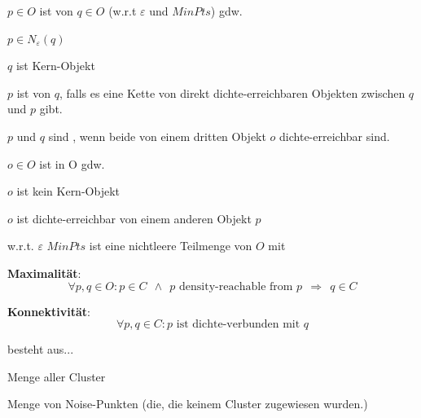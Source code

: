 \documentclass[10pt]{article} %
\begin{document}
\begin{definition} 
     $p \in O$ ist  von $q \in O$ (w.r.t $\varepsilon$ und $\mathit{MinPts}$) gdw.
\begin{cptitemize} 
     \item $p \in N_\varepsilon(q)$ 
     \item $q$ ist Kern-Objekt
\end{cptitemize} 
\end{definition} 

\begin{definition} 
     $p$ ist  von $q$, falls es eine Kette von direkt dichte-erreichbaren Objekten zwischen $q$ und $p$ gibt. 
\end{definition} 

\begin{definition} 
     $p$ und $q$ sind , wenn beide von einem dritten Objekt $o$ dichte-erreichbar sind. 
\end{definition} 

\begin{definition} 
     $o \in O$ ist  in O gdw.
\begin{cptitemize} 
     \item $o$ ist kein Kern-Objekt
     \item $o$ ist dichte-erreichbar von einem anderen Objekt $p$ 
\end{cptitemize}  
\end{definition} 

\begin{definition}[Cluster] w.r.t. $\varepsilon$ $\mathit{MinPts}$ ist eine nichtleere Teilmenge von $O$ mit
\begin{cptitemize} 
     \item \textbf{Maximalität}: $$
      \forall p,q \in O: p \in C ~~ \land ~~ p \text{ density-reachable from } p ~~ \Rightarrow ~~ q \in C
     $$
     \item \textbf{Konnektivität}: $$
      \forall p,q \in C: p \text{ ist dichte-verbunden mit } q
     $$
\end{cptitemize} 
\end{definition} 

\begin{definition}[Clustering] besteht aus...
     \begin{cptitemize} 
           \item  Menge aller Cluster
           \item Menge von Noise-Punkten (die, die keinem Cluster zugewiesen wurden.)
      \end{cptitemize}  
\end{definition} 
\end{document}
